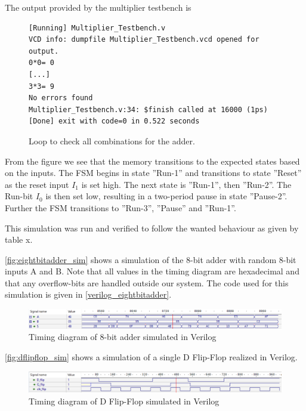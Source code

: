 The output provided by the multiplier testbench is 

\begin{figure}[H]
\centering
\caption{Loop to check all combinations for the adder.}
\label{fig:verilog_adderTB_excerpt}
\begin{minipage}{0.8\textwidth}
\begin{lstlisting}[style=verilogStyle]
[Running] Multiplier_Testbench.v
VCD info: dumpfile Multiplier_Testbench.vcd opened for output.
0*0= 0
[...]
3*3= 9
No errors found
Multiplier_Testbench.v:34: $finish called at 16000 (1ps)
[Done] exit with code=0 in 0.522 seconds
\end{lstlisting}
\end{minipage}
\end{figure}






From the figure we see that the memory transitions to the expected states based on the inputs. The FSM begins in state ''Run-1'' and transitions to state ''Reset'' as the reset input $I_1$ is set high. The next state is ''Run-1'', then ''Run-2''. The Run-bit $I_0$ is then set low, resulting in a two-period pause in state ''Pause-2''. Further the FSM transitions to ''Run-3'', ''Pause'' and ''Run-1''.

This simulation was run and verified to follow the wanted behaviour as given by table x.

\autoref{fig:eightbitadder_sim} shows a simulation of the 8-bit adder with random 8-bit inputs A and B. Note that all values in the timing diagram are hexadecimal and that any overflow-bits are handled outside our system. The code used for this simulation is given in \autoref{verilog_eightbitadder}.

\begin{figure}[H]
    \centering
    \includegraphics[width=\textwidth]{Figures/Test of eightbitadder.png}
    \caption{Timing diagram of 8-bit adder simulated in Verilog}
    \label{fig:eightbitadder_sim}
\end{figure}

\autoref{fig:dflipflop_sim} shows a simulation of a single D Flip-Flop realized in Verilog.

\begin{figure}[H]
    \centering
    \includegraphics[width=\textwidth]{Figures/Test of Dflipflop.png}
    \caption{Timing diagram of D Flip-Flop simulated in Verilog}
    \label{fig:dflipflop_sim}
\end{figure}

